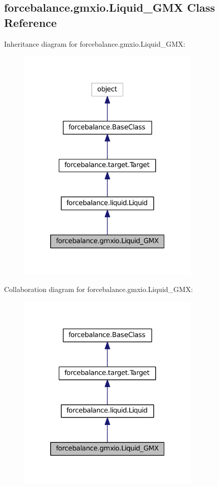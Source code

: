 \hypertarget{classforcebalance_1_1gmxio_1_1Liquid__GMX}{\subsection{forcebalance.\-gmxio.\-Liquid\-\_\-\-G\-M\-X Class Reference}
\label{classforcebalance_1_1gmxio_1_1Liquid__GMX}
}


Inheritance diagram for forcebalance.\-gmxio.\-Liquid\-\_\-\-G\-M\-X\-:\nopagebreak
\begin{figure}[H]
\begin{center}
\leavevmode
\includegraphics[width=246pt]{classforcebalance_1_1gmxio_1_1Liquid__GMX__inherit__graph}
\end{center}
\end{figure}


Collaboration diagram for forcebalance.\-gmxio.\-Liquid\-\_\-\-G\-M\-X\-:\nopagebreak
\begin{figure}[H]
\begin{center}
\leavevmode
\includegraphics[width=246pt]{classforcebalance_1_1gmxio_1_1Liquid__GMX__coll__graph}
\end{center}
\end{figure}
